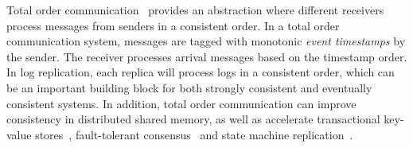 Total order communication~\cite{kshemkalyani2011distributed} provides an abstraction where different receivers process messages from senders in a consistent order. In a total order communication system, messages are tagged with monotonic \textit{event timestamps} by the sender. The receiver processes arrival messages based on the timestamp order. In log replication, each replica will process logs in a consistent order, which can be an important building block for both strongly consistent and eventually consistent systems. In addition, total order communication can improve consistency in distributed shared memory, as well as accelerate transactional key-value stores~\cite{ports2015designing, eris}, fault-tolerant consensus~\cite{li2016just} and state machine replication~\cite{state-machine-replication}.





